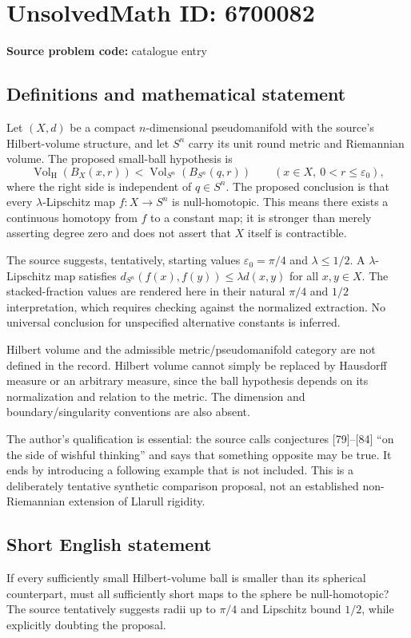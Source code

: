 \documentclass[11pt]{article}
\begin{document}
\section*{UnsolvedMath ID: 6700082}
\textbf{Source problem code:} catalogue entry
\subsection{Definitions and mathematical statement}
Let $(X,d)$ be a compact $n$-dimensional pseudomanifold with the source's Hilbert-volume structure, and let $S^n$ carry its unit round metric and Riemannian volume. The proposed small-ball hypothesis is
\[
\operatorname{Vol}_{\mathrm H}(B_X(x,r))
<\operatorname{Vol}_{S^n}(B_{S^n}(q,r))
\qquad(x\in X,\ 0<r\leq\varepsilon_0),
\]
where the right side is independent of $q\in S^n$. The proposed conclusion is that every $\lambda$-Lipschitz map $f:X\to S^n$ is null-homotopic. This means there exists a continuous homotopy from $f$ to a constant map; it is stronger than merely asserting degree zero and does not assert that $X$ itself is contractible.

The source suggests, tentatively, starting values $\varepsilon_0=\pi/4$ and $\lambda\leq1/2$. A $\lambda$-Lipschitz map satisfies $d_{S^n}(f(x),f(y))\leq\lambda d(x,y)$ for all $x,y\in X$. The stacked-fraction values are rendered here in their natural $\pi/4$ and $1/2$ interpretation, which requires checking against the normalized extraction. No universal conclusion for unspecified alternative constants is inferred.

Hilbert volume and the admissible metric/pseudomanifold category are not defined in the record. Hilbert volume cannot simply be replaced by Hausdorff measure or an arbitrary measure, since the ball hypothesis depends on its normalization and relation to the metric. The dimension and boundary/singularity conventions are also absent.

The author's qualification is essential: the source calls conjectures [79]--[84] ``on the side of wishful thinking'' and says that something opposite may be true. It ends by introducing a following example that is not included. This is a deliberately tentative synthetic comparison proposal, not an established non-Riemannian extension of Llarull rigidity.
\subsection{Short English statement}
If every sufficiently small Hilbert-volume ball is smaller than its spherical counterpart, must all sufficiently short maps to the sphere be null-homotopic? The source tentatively suggests radii up to $\pi/4$ and Lipschitz bound $1/2$, while explicitly doubting the proposal.
\end{document}
